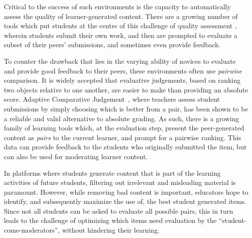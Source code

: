 \documentclass[runningheads]{llncs}
\begin{document}
Critical to the success of such environments is the capacity to 
automatically assess the quality of learner-generated content.
There are a growing number of tools which put students at the centre of this 
challenge of quality assessment
\cite{potter_compair:_2017}\cite{cambre_juxtapeer:_2018},
wherein students submit their own work, and then are prompted to 
evaluate a subset of their peers' submissions, and sometimes even provide 
feedback.

To counter the drawback that lies in the varying ability of novices to evaluate 
and provide good feedback to their peers, these environments often use 
\textit{pairwise} comparison. 
It is widely accepted that evaluative judgements, based on ranking two objects 
relative to one another, are easier to make than providing an absolute score. 
Adaptive Comparative Judgement~\cite{pollitt_method_2012}, where teachers 
assess student submissions by simply choosing which is better from a pair, has 
been shown to be a reliable and valid alternative to absolute grading.
As such, there is a growing family of learning tools which, at the evaluation 
step, present the peer-generated content as \textit{pairs} to the current 
learner, and prompt for a pairwise ranking. 
This data can provide feedback to the students who originally submitted the 
item, but can also be used for moderating learner content.

In platforms where students generate content that is part of the learning 
activities of future students, filtering out irrelevant and misleading material 
is paramount. 
However, while removing bad content is important, educators hope to identify, 
and subsequently maximize the use of, the best student generated items.
Since not all students can be asked to evaluate all possible pairs, this in 
turn leads to the challenge of optimizing which items need evaluation by the 
``student-come-moderators'', without hindering their learning.
 
\end{document}
